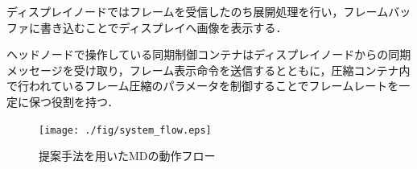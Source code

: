 ディスプレイノードではフレームを受信したのち展開処理を行い，フレームバッファに書き込むことでディスプレイへ画像を表示する．

ヘッドノードで操作している同期制御コンテナはディスプレイノードからの同期メッセージを受け取り，フレーム表示命令を送信するとともに，圧縮コンテナ内で行われているフレーム圧縮のパラメータを制御することでフレームレートを一定に保つ役割を持つ．

\begin{figure}[H]
    \hspace*{\fill}
    \texttt{[image: ./fig/system\_flow.eps]}
    \hspace*{\fill}
    \caption{提案手法を用いたMDの動作フロー}
\end{figure}
